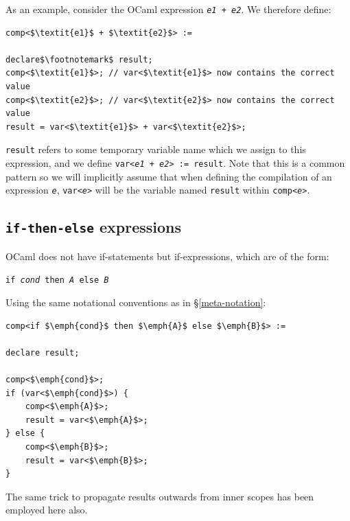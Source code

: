 As an example, consider the OCaml expression \texttt{\textit{e1} + \textit{e2}}.
We therefore define:

\begin{lstlisting}
comp<$\textit{e1}$ + $\textit{e2}$> :=

declare$\footnotemark$ result;
comp<$\textit{e1}$>; // var<$\textit{e1}$> now contains the correct value
comp<$\textit{e2}$>; // var<$\textit{e2}$> now contains the correct value
result = var<$\textit{e1}$> + var<$\textit{e2}$>;
\end{lstlisting}

\texttt{result} refers to some temporary variable name which we assign to this
expression, and we define \texttt{var<\textit{e1} + \textit{e2}> := result}.
Note that this is a common pattern so we will implicitly assume that when
defining the compilation of an expression \texttt{\textit{e}},
\texttt{var<\textit{e}>} will be the variable named \texttt{result} within
\texttt{comp<\textit{e}>}.

\subsection{\texttt{if-then-else} expressions}

OCaml does not have if-statements but if-expressions, which are of the form:

\begin{center}
    \texttt{if \emph{cond} then \emph{A} else \emph{B}}
\end{center}

Using the same notational conventions as in \S\ref{meta-notation}:

\begin{lstlisting}
comp<if $\emph{cond}$ then $\emph{A}$ else $\emph{B}$> :=

declare result;

comp<$\emph{cond}$>;
if (var<$\emph{cond}$>) {
    comp<$\emph{A}$>;
    result = var<$\emph{A}$>;
} else {
    comp<$\emph{B}$>;
    result = var<$\emph{B}$>;
}
\end{lstlisting}

The same trick to propagate results outwards from inner scopes has been 
employed here also.

